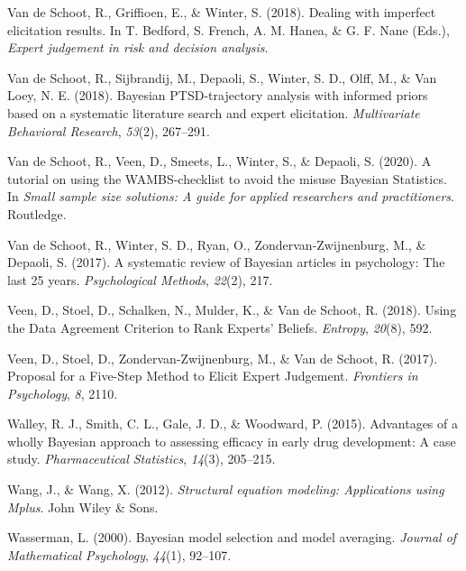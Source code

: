 \documentclass[openright,titlepage,12pt,a4paper]{book}
\begin{document}
\leavevmode\hypertarget{ref-van_de_schoot_dealing_2018}{}%
Van de Schoot, R., Griffioen, E., \& Winter, S. (2018). Dealing with imperfect elicitation results. In T. Bedford, S. French, A. M. Hanea, \& G. F. Nane (Eds.), \emph{Expert judgement in risk and decision analysis}.

\leavevmode\hypertarget{ref-van_de_schoot_bayesian_2018}{}%
Van de Schoot, R., Sijbrandij, M., Depaoli, S., Winter, S. D., Olff, M., \& Van Loey, N. E. (2018). Bayesian PTSD-trajectory analysis with informed priors based on a systematic literature search and expert elicitation. \emph{Multivariate Behavioral Research}, \emph{53}(2), 267--291.

\leavevmode\hypertarget{ref-van_de_schoot_tutorial_2020}{}%
Van de Schoot, R., Veen, D., Smeets, L., Winter, S., \& Depaoli, S. (2020). A tutorial on using the WAMBS-checklist to avoid the misuse Bayesian Statistics. In \emph{Small sample size solutions: A guide for applied researchers and practitioners}. Routledge.

\leavevmode\hypertarget{ref-van_de_schoot_systematic_2017}{}%
Van de Schoot, R., Winter, S. D., Ryan, O., Zondervan-Zwijnenburg, M., \& Depaoli, S. (2017). A systematic review of Bayesian articles in psychology: The last 25 years. \emph{Psychological Methods}, \emph{22}(2), 217.

\leavevmode\hypertarget{ref-veen_using_2018}{}%
Veen, D., Stoel, D., Schalken, N., Mulder, K., \& Van de Schoot, R. (2018). Using the Data Agreement Criterion to Rank Experts' Beliefs. \emph{Entropy}, \emph{20}(8), 592.

\leavevmode\hypertarget{ref-veen_proposal_2017}{}%
Veen, D., Stoel, D., Zondervan-Zwijnenburg, M., \& Van de Schoot, R. (2017). Proposal for a Five-Step Method to Elicit Expert Judgement. \emph{Frontiers in Psychology}, \emph{8}, 2110.

\leavevmode\hypertarget{ref-walley_advantages_2015}{}%
Walley, R. J., Smith, C. L., Gale, J. D., \& Woodward, P. (2015). Advantages of a wholly Bayesian approach to assessing efficacy in early drug development: A case study. \emph{Pharmaceutical Statistics}, \emph{14}(3), 205--215.

\leavevmode\hypertarget{ref-wang_structural_2012}{}%
Wang, J., \& Wang, X. (2012). \emph{Structural equation modeling: Applications using Mplus}. John Wiley \& Sons.

\leavevmode\hypertarget{ref-wasserman_bayesian_2000}{}%
Wasserman, L. (2000). Bayesian model selection and model averaging. \emph{Journal of Mathematical Psychology}, \emph{44}(1), 92--107.
\end{document}
